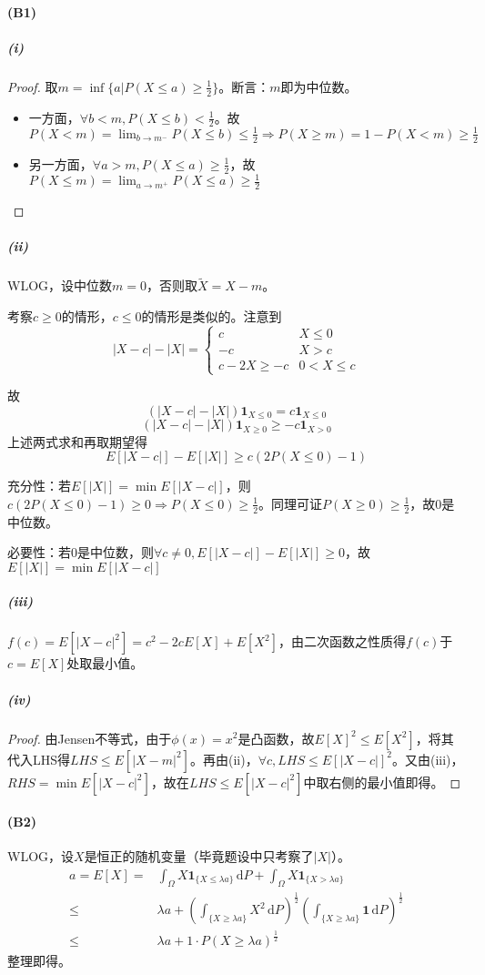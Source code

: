 \documentclass{ctexart}
\begin{document}
\newcommand{\dd}{\,\mathrm{d}}
\newcommand{\R}{\mathbb{R}}
\newcommand{\st}{\text{ s.t. }}

\paragraph{(B1)}
\subparagraph{(i)}
\begin{proof}
  取$m=\inf\{a|P(X\leq a)\geq \frac{1}{2}\}$。断言：$m$即为中位数。
  \begin{itemize}
  \item 一方面，$\forall b<m, P(X\leq b)<\frac{1}{2}$。故$P(X< m)=\lim_{b\to m^{-}}P(X\leq b)\leq \frac{1}{2}\Rightarrow P(X\geq m)=1-P(X<m)\geq \frac{1}{2}$
  \item 另一方面，$\forall a>m, P(X\leq a)\geq\frac{1}{2}$，故$P(X\leq m)=\lim_{a\to m^{+}}P(X\leq a)\geq\frac{1}{2}$
  \end{itemize}
\end{proof}

\subparagraph{(ii)}
WLOG，设中位数$m=0$，否则取$\tilde X=X-m$。

考察$c\geq 0$的情形，$c\leq 0$的情形是类似的。注意到
\[|X-c|-|X|=
  \begin{cases}
    c &X\leq 0\\
    -c &X>c\\
    c-2X\geq -c & 0<X\leq c
  \end{cases}
\]

故
\[(|X-c|-|X|)\bm{1}_{X\leq 0}=c\bm{1}_{X\leq 0}\]
\[(|X-c|-|X|)\bm{1}_{X\geq 0}\geq -c\bm{1}_{X> 0}\]
上述两式求和再取期望得
\[E[|X-c|]-E[|X|]\geq c(2P(X\leq 0)-1)\]

充分性：若$E[|X|]=\min E[|X-c|]$，则$c(2P(X\leq 0)-1)\geq 0\Rightarrow P(X\leq 0)\geq \frac{1}{2}$。同理可证$P(X\geq 0)\geq \frac{1}{2}$，故0是中位数。

必要性：若$0$是中位数，则$\forall c\neq 0,E[|X-c|]-E[|X|]\geq 0$，故$E[|X|]=\min E[|X-c|]$

\subparagraph{(iii)}
$f(c)=E[|X-c|^{2}]=c^{2}-2cE[X]+E[X^{2}]$，由二次函数之性质得$f(c)$于$c=E[X]$处取最小值。

\subparagraph{(iv)}
\begin{proof}
  由Jensen不等式，由于$\phi(x)=x^{2}$是凸函数，故$E[X]^{2}\leq E[X^{2}]$，将其代入LHS得$LHS\leq E[|X-m|^{2}]$。再由(ii)，$\forall c,LHS\leq E[|X-c|]^{2}$。又由(iii)，$RHS=\min E[|X-c|^{2}]$，故在$LHS\leq E[|X-c|^{2}]$中取右侧的最小值即得。
\end{proof}

\paragraph{(B2)}
WLOG，设$X$是恒正的随机变量（毕竟题设中只考察了$|X|$）。
\begin{align*}
  a=E[X]=&\int_{\Omega}X\bm{1}_{\{X\leq \lambda a\}}\dd P+\int_{\Omega}X\bm{1}_{\{X>\lambda a\}}\\
  \leq &\lambda a+(\int_{\{X\geq\lambda a\}}X^{2}\dd P)^{\frac 1 2}(\int_{\{X\geq\lambda a\}}\bm{1}\dd P)^{\frac 1 2}\\ 
  \leq &\lambda a+1\cdot P(X\geq\lambda a)^{\frac 1 2}
\end{align*}
  整理即得。
\end{document}
